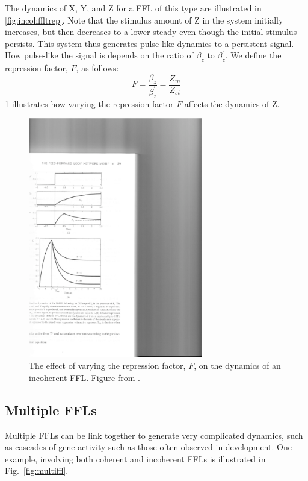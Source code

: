 \documentclass[11pt,letterpaper,oneside,pagesize]{scrartcl}
\begin{document}
The dynamics of X, Y, and Z for a FFL of this type are illustrated in \cref{fig:incohffltrep}.  Note that the stimulus amount of Z in the system initially increases, but then decreases to a lower steady even though the initial stimulus persists. This system thus generates pulse-like dynamics to a persistent signal. How pulse-like the signal is depends on the ratio of $\beta_z$ to $\beta_{z}^{'}$. We define the repression factor, $F$, as follows:
%
\[
F = \frac{\beta_z}{\beta_{z}^{'}} = \frac{Z_m}{Z_{st}}
\]
%
\cref{fig:incohfflpulse} illustrates how varying the repression factor $F$ affects the dynamics of Z.

\begin{figure}[lht]
\centering
 \includegraphics[width=3in]{incoh-ffl-pulse.pdf}
\caption{The effect of varying the repression factor, $F$, on the dynamics of an incoherent FFL. Figure from \cite{Alon2007book}.}
\label{fig:incohfflpulse}
\end{figure}

\subsection{Multiple FFLs}

Multiple FFLs can be link together to generate very complicated dynamics, such as cascades of gene activity such as those often observed in development.  One example, involving both coherent and incoherent FFLs is illustrated in Fig.~\ref{fig:multiffl}.
\end{document}
